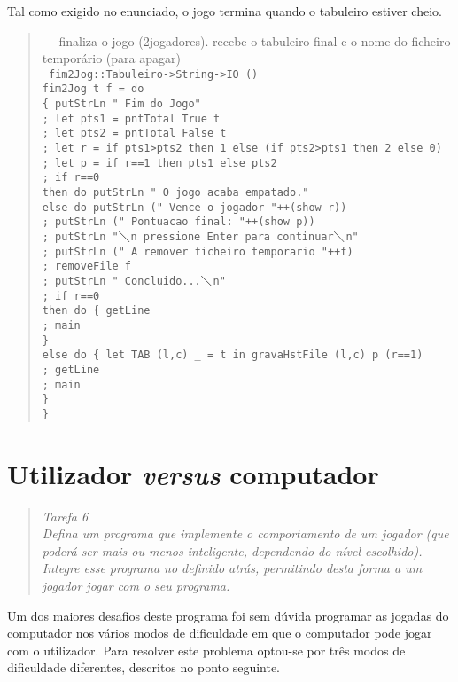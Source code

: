 \documentclass[a4paper,titlepage]{scrreprt}
\begin{document}
Tal como exigido no enunciado, o jogo termina quando o tabuleiro estiver cheio.
	\begin{quote}
		{\small - - finaliza o jogo (2jogadores). recebe o tabuleiro final e o nome do ficheiro temporário (para apagar)\\}
		{\tt
		fim2Jog::Tabuleiro->String->IO ()\\
		fim2Jog t f = do\\
		\{ putStrLn " Fim do Jogo"\\
		; let pts1 = pntTotal True t\\
		; let pts2 = pntTotal False t\\
		; let r = if pts1>pts2 then 1 else (if pts2>pts1 then 2 else 0)\\
		; let p = if r==1 then pts1 else pts2\\
		; if r==0\\
		then do putStrLn " O jogo acaba empatado."\\
		else do	putStrLn (" Vence o jogador "++(show r))\\
		; putStrLn (" Pontuacao final: "++(show p))\\
		; putStrLn "$\diagdown$n pressione Enter para continuar$\diagdown$n"\\
		; putStrLn (" A remover ficheiro temporario "++f)\\
		; removeFile f\\
		; putStrLn " Concluido...$\diagdown$n"\\
		; if r==0\\
		then do	\{ getLine\\
		; main\\
		\}\\
		else do	\{ let TAB (l,c) \_ = t in gravaHstFile (l,c) p (r==1)\\
		; getLine\\
		; main\\
		\}\\
		\}
		}
	\end{quote}
\chapter{Utilizador {\it versus} computador}
	\begin{quote}
		\begin{center}
			{\it
			Tarefa 6\\
			Defina um programa que implemente o comportamento de um jogador (que poderá ser
			mais ou menos inteligente, dependendo do nível escolhido). Integre esse programa no
			definido atrás, permitindo desta forma a um jogador jogar com o seu programa.
			}
		\end{center}
	\end{quote}
Um dos maiores desafios deste programa foi sem dúvida programar as jogadas do computador nos vários modos de dificuldade em que o computador
pode jogar com o utilizador. Para resolver este problema optou-se por três modos de dificuldade diferentes, descritos no ponto seguinte.
\end{document}
